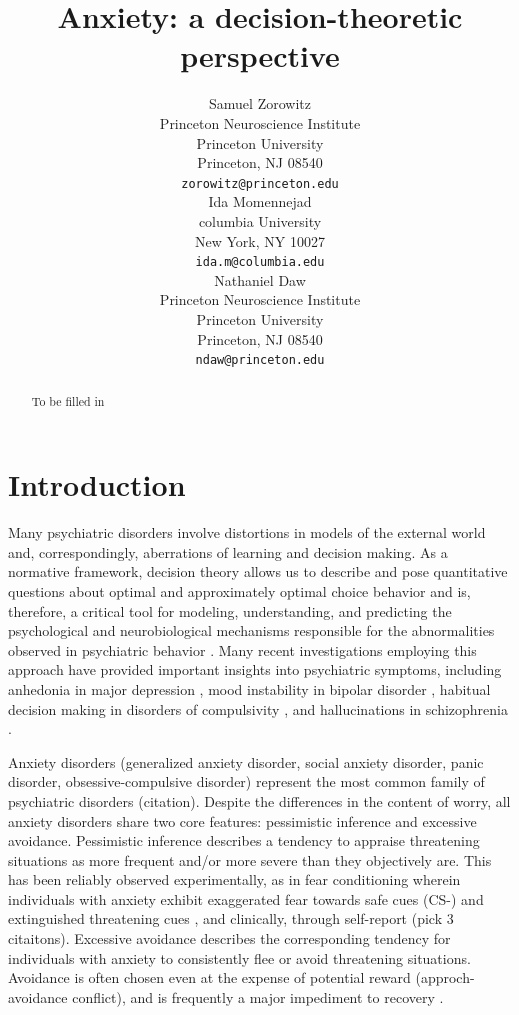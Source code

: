 \documentclass[11pt]{article} %
\title{Anxiety: a decision-theoretic perspective}
\author{
Samuel Zorowitz \\
Princeton Neuroscience Institute\\
Princeton University\\
Princeton, NJ 08540 \\
\texttt{zorowitz@princeton.edu} \\
\And
Ida Momennejad \\
columbia University\\
New York, NY 10027 \\
\texttt{ida.m@columbia.edu} \\
\And
Nathaniel Daw \\
Princeton Neuroscience Institute\\
Princeton University\\
Princeton, NJ 08540 \\
\texttt{ndaw@princeton.edu} \\
}
\begin{document}
\maketitle

\begin{abstract}
To be filled in
\end{abstract}


\startmain

\section{Introduction}
Many psychiatric disorders involve distortions in models of the external world
and, correspondingly, aberrations of learning and decision making. As a normative
framework, decision theory allows us to describe and pose quantita­tive questions
about optimal and approximately optimal choice behavior \citep{DayanDaw2008} and
is, therefore, a critical tool for modeling, understanding, and predicting the
psychological and neurobiological mechanisms responsible for the abnormalities
observed in psychiatric behavior \citep{HuysDawDayan2015}. Many recent investigations
employing this approach have provided important insights into psychiatric symptoms,
including anhedonia in major depression \citep{Rutledge2017}, mood instability
in bipolar disorder \citep{EldarNiv2015, EldarDolanNiv2016},  habitual decision
making in disorders of compulsivity \citep{gillan2016}, and hallucinations in
schizophrenia \citep{powers2017, corlett2018}.

Anxiety disorders (generalized anxiety disorder, social anxiety disorder, panic
disorder, obsessive-compulsive disorder) represent the most common family of
psychiatric disorders (citation). Despite the differences in the content of worry,
all anxiety disorders share two core features: pessimistic inference and excessive
avoidance. Pessimistic inference describes a tendency to appraise threatening
situations as more frequent and/or more severe than they objectively are. This has
been reliably observed experimentally, as in fear conditioning wherein individuals
with anxiety exhibit exaggerated fear towards safe cues (CS-) and extinguished
threatening cues \citep{lissek2005, Duits2015}, and clinically, through self-report
(pick 3 citaitons). Excessive avoidance describes the corresponding tendency for
individuals with anxiety to consistently flee or avoid threatening situations.
Avoidance is often chosen even at the expense of potential reward (approch-avoidance
conflict), and is frequently a major impediment to recovery \citep{Arnaudova2017}.
\end{document}
